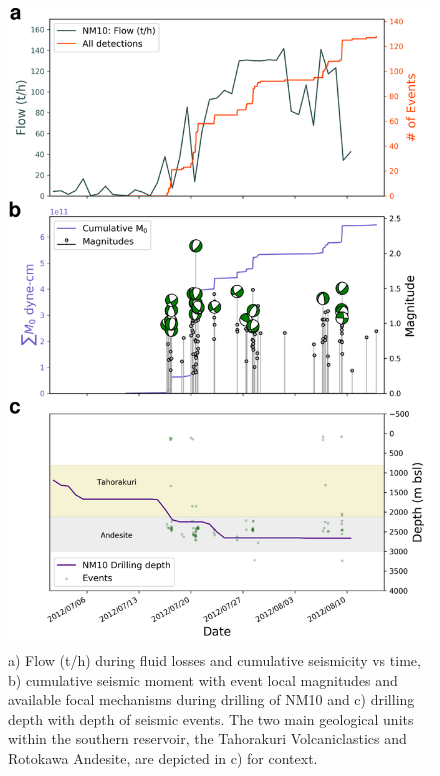 \begin{figure}[h!]
\begin{center}
\includegraphics[width=0.84\columnwidth]{Chapter_3_Nga/figures/Multiplet_150_vs_flow_cum_NM10_losses/Full_final_cat_flow_mags_FMs_depth_NM10_Drilling_12-5_GrowClust_no_diff_ABC}
\caption[Seismicity and injection parameters for NM10 drilling]{{
a) Flow (t/h) during fluid losses and cumulative seismicity vs time, b)
cumulative seismic moment with event local magnitudes and available
focal mechanisms during drilling of NM10 and c) drilling depth with
depth of seismic events. The two main geological units within the
southern reservoir, the Tahorakuri Volcaniclastics and Rotokawa
Andesite, are depicted in c) for context.
{\label{703798}}%
}}
\end{center}
\end{figure}

